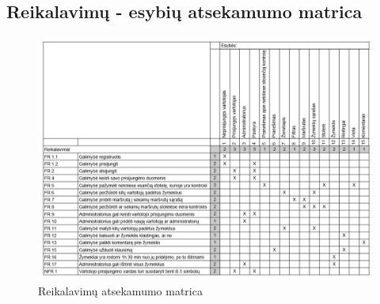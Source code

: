 \documentclass{VUMIFPSkursinis}
\begin{document}
\subsection{Reikalavimų - esybių atsekamumo matrica}
	\begin{figure}[H]
				\centering
				\includegraphics[scale=0.4]{img/esybiu_matrica}
				\caption{Reikalavimų atsekamumo matrica}
				\label{img:matrix}
			\end{figure}
\end{document}
